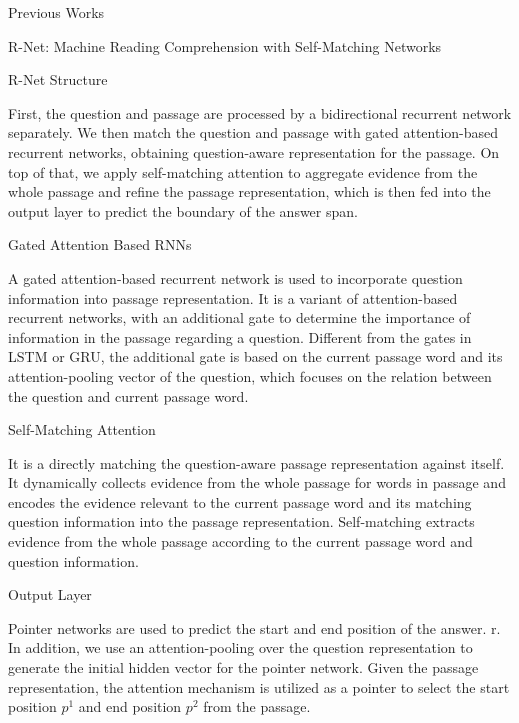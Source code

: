 \documentclass{article}
\begin{document}
\begin{psection}{Previous Works}
\begin{psubsection}{R-Net: Machine Reading Comprehension with Self-Matching Networks}
		\begin{subsubsection}{R-Net Structure}

			\sloppy
			First, the question and passage are processed by a bidirectional recurrent network separately. We then match the question and passage with gated attention-based recurrent networks, obtaining question-aware representation for the passage. On top of that, we apply self-matching attention to aggregate evidence from the whole passage and refine the passage representation, which is then fed into the output layer to predict the boundary of the answer span.

		\end{subsubsection}

		\begin{subsubsection}{Gated Attention Based RNNs}

			A gated attention-based recurrent network is used to incorporate question information into passage representation. It is a variant of attention-based recurrent networks, with an additional gate to determine the importance of information in the passage regarding a question. Different from the gates in LSTM or GRU, the additional gate is based on the current passage word and its attention-pooling vector of the question, which focuses on the relation between the question and current passage word.

		\end{subsubsection}

		\begin{subsubsection}{Self-Matching Attention}

			It is a directly matching the question-aware passage representation against itself. It dynamically collects evidence from the whole passage for words in passage and encodes the evidence relevant to the current passage word and its matching question information into the passage representation. Self-matching extracts evidence from the whole passage according to the current passage word and question information.

		\end{subsubsection}

		\begin{subsubsection}{Output Layer}

			Pointer networks are used to predict the start and end position of the answer. r. In addition, we use an attention-pooling over the question representation to generate the initial hidden vector for the pointer network. Given the passage representation, the attention mechanism is utilized as a pointer to select the start position $p^1$ and end position $p^2$ from the passage.


\end{subsubsection}
\end{psubsection}
\end{psection}
\end{document}
